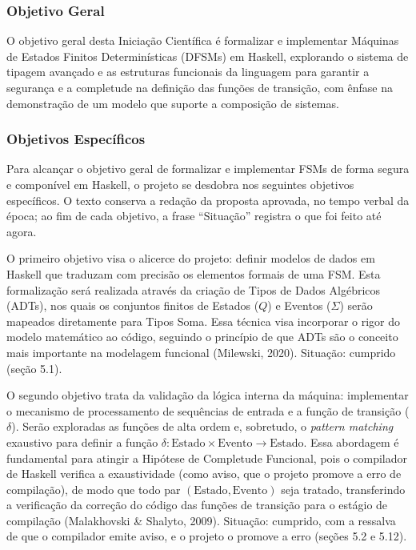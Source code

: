 \documentclass[12pt,a4paper]{article}
\begin{document}
\subsubsection{Objetivo Geral}
O objetivo geral desta Iniciação Científica é formalizar e implementar Máquinas de Estados Finitos Determinísticas (DFSMs) em Haskell, explorando o sistema de tipagem avançado e as estruturas funcionais da linguagem para garantir a segurança e a completude na definição das funções de transição, com ênfase na demonstração de um modelo que suporte a composição de sistemas.

\subsubsection{Objetivos Específicos}

Para alcançar o objetivo geral de formalizar e implementar FSMs de forma segura e componível em Haskell, o projeto se desdobra nos seguintes objetivos específicos. O texto conserva a redação da proposta aprovada, no tempo verbal da época; ao fim de cada objetivo, a frase ``Situação'' registra o que foi feito até agora.

O primeiro objetivo visa o alicerce do projeto: definir modelos de dados em Haskell que traduzam com precisão os elementos formais de uma FSM. Esta formalização será realizada através da criação de Tipos de Dados Algébricos (ADTs), nos quais os conjuntos finitos de Estados ($Q$) e Eventos ($\Sigma$) serão mapeados diretamente para Tipos Soma. Essa técnica visa incorporar o rigor do modelo matemático ao código, seguindo o princípio de que ADTs são o conceito mais importante na modelagem funcional (Milewski, 2020). Situação: cumprido (seção 5.1).

O segundo objetivo trata da validação da lógica interna da máquina: implementar o mecanismo de processamento de sequências de entrada e a função de transição ($\delta$). Serão exploradas as funções de alta ordem e, sobretudo, o \textit{pattern matching} exaustivo para definir a função $\delta: \text{Estado} \times \text{Evento} \to \text{Estado}$. Essa abordagem é fundamental para atingir a Hipótese de Completude Funcional, pois o compilador de Haskell verifica a exaustividade (como aviso, que o projeto promove a erro de compilação), de modo que todo par $(\text{Estado}, \text{Evento})$ seja tratado, transferindo a verificação da correção do código das funções de transição para o estágio de compilação (Malakhovski \& Shalyto, 2009). Situação: cumprido, com a ressalva de que o compilador emite aviso, e o projeto o promove a erro (seções 5.2 e 5.12).
\end{document}
